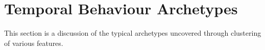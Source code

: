 \section{Temporal Behaviour Archetypes}
\label{sec:archetypes}

This section is a discussion of the typical archetypes uncovered through clustering of various features.